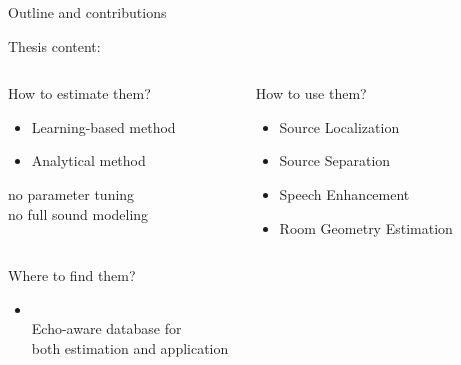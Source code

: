 \begin{frame}{Outline and contributions}
\begin{block}{Thesis content:}
        \vspace*{2mm}
        \begin{columns}[T,onlytextwidth]
        \begin{column}{0.48\textwidth}
            \centering
            \alert{How to estimate them?}
            \begin{itemize}
                \item Learning-based method
                \item Analytical method
            \end{itemize}
            {\small no parameter tuning
            \\no full sound modeling}
        \end{column}
        \begin{column}{0.48\textwidth}
            \centering
            \alert{How to use them?}
            \begin{itemize}
                \item Source Localization
                \item Source Separation
                \item Speech Enhancement
                \item Room Geometry Estimation
            \end{itemize}
        \end{column}
    \end{columns}

        \alert{Where to find them?}
        \begin{itemize}
            \item \dechorate
            \\Echo-aware database for
            \\both estimation and application
        \end{itemize}
    \end{block}
\end{frame}